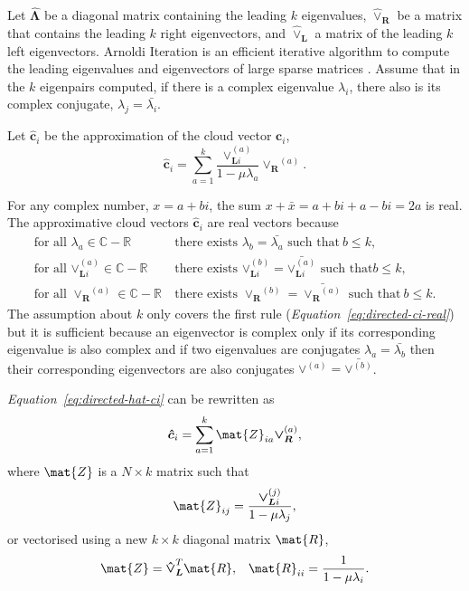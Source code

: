 \documentclass[12pt]{report}
\newcommand*\conj[1]{\bar{#1}}
\begin{document}
Let $\bm{\hat{\Lambda}}$ be a diagonal matrix containing the leading $k$
eigenvalues, $\bm{\hat{\vee}_R}$ be a matrix that contains the leading $k$ right
eigenvectors, and $\bm{\hat{\vee}_L}$ a matrix of the leading $k$ left
eigenvectors. Arnoldi Iteration is an efficient iterative algorithm to compute
the leading eigenvalues and eigenvectors of large sparse matrices
\cite{lehoucq1996deflation}. Assume that in the $k$ eigenpairs computed, if
there is a complex eigenvalue $\lambda_i$, there also is its complex conjugate,
$\lambda_j = \conj{\lambda_i}$.


Let $\bm{\hat{c}}_i$ be the approximation of the cloud vector $\bm{c}_i$,
\begin{equation}
  \label{eq:directed-hat-ci}
  \bm{\hat{c}}_i = \sum_{a=1}^k \frac{\bm{\vee}_{\bm{L}i}^{(a)}}
             {1 - \mu \lambda_a} \bm{\vee_R}^{(a)}.
\end{equation}

For any complex number, $x = a+bi$, the sum $x + \conj{x} = a + bi + a - bi =
2a$ is real. The approximative cloud vectors $\bm{\hat{c}}_i$ are real vectors
because
\begin{align}
  \label{eq:directed-ci-real}
  \text{for all } \lambda_a \in \mathbb{C}-\mathbb{R} \
    &\text{there exists } \lambda_b = \conj{\lambda_a}
    \text{ such that} \ b \leq k, \\
  \text{for all } \bm{\vee}_{\bm{L}i}^{(a)} \in \mathbb{C}-\mathbb{R} \
    &\text{there exists } \bm{\vee}_{\bm{L}i}^{(b)} = \conj{\bm{\vee}_{\bm{L}i}^{(a)}}
    \text{ such that} b \leq k, \\
  \text{for all } \bm{\vee_R}^{(a)} \in \mathbb{C}-\mathbb{R} \
    &\text{there exists } \bm{\vee_R}^{(b)} = \conj{\bm{\vee_R}^{(a)}}
    \text{ such that} \ b \leq k.
\end{align}
The assumption about $k$ only covers the first rule
(\emph{Equation~\ref{eq:directed-ci-real}}) but it is sufficient because an
eigenvector is complex only if its corresponding eigenvalue is also complex and
if two eigenvalues are conjugates $\lambda_a = \conj{\lambda_b}$ then their
corresponding eigenvectors are also conjugates $\bm{\vee}^{(a)} =
\conj{\bm{\vee}^{(b)}}$.

%
%

\emph{Equation~\ref{eq:directed-hat-ci}} can be rewritten as
\begin{equation}
  \bm{\hat{c}}_i = \sum_{a=1}^k \mat{Z}_{ia} \bm{\vee_R}^{(a)},
\end{equation}
where $\mat{Z}$ is a $N \times k$ matrix such that
\begin{equation}
  \mat{Z}_{ij} = \frac{\bm{\vee}_{\bm{L}i}^{(j)}}{1 - \mu \lambda_j},
\end{equation}
or vectorised using a new $k \times k$ diagonal matrix $\mat{R}$,
\begin{align}
  \label{eq:directed-z-vectorised}
  \mat{Z} = \bm{\hat{\vee}_L}^T \mat{R}, &&
  \mat{R}_{ii} = \frac{1}{1 - \mu \lambda_i}.
\end{align}
\end{document}
